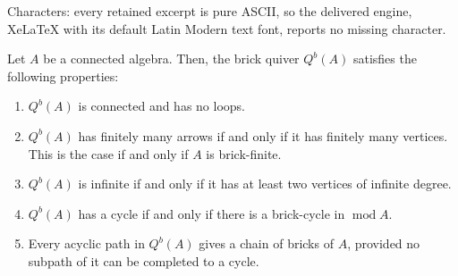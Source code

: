 \documentclass[10pt,a4paper]{amsart}
\DeclareMathOperator*{\modu}{mod}
\begin{document}
Characters: every retained excerpt is pure ASCII, so the delivered engine, XeLaTeX with its default Latin Modern text font, reports no missing character.
\begin{prop}
Let $A$ be a connected algebra. Then, the brick quiver $Q^b(A)$ satisfies the following properties:
    \begin{enumerate}
    \item $Q^b(A)$ is connected and has no loops.
    \item $Q^b(A)$ has finitely many arrows if and only if it has finitely many vertices. This is the case if and only if $A$ is brick-finite.
    \item $Q^b(A)$ is infinite if and only if it has at least two vertices of infinite degree.
    \item $Q^b(A)$ has a cycle if and only if there is a brick-cycle in $\modu A$.
    \item Every acyclic path in $Q^b(A)$ gives a chain of bricks of $A$, provided no subpath of it can be completed to a cycle.
\end{enumerate}
\end{prop}
\end{document}
